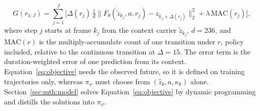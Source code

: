 \begin{equation}
G(r_{1:J})=\sum_{j=1}^{J}\Big[\Delta(r_j)\,\tfrac1d\big\lVert F_\theta(\tilde z_{k_j},a,r_j)-z_{k_j+\Delta(r_j)}\big\rVert_2^2+\lambda\,\mathrm{MAC}(r_j)\Big],
\label{eq:objective}
\end{equation}
where step $j$ starts at frame $k_j$ from the context carrier $\tilde z_{k_j}$, $d=236$, and $\mathrm{MAC}(r)$ is the multiply-accumulate count of one transition under $r$, policy included, relative to the continuous transition at $\Delta=15$. The error term is the duration-weighted error of one prediction from its context. Equation~\ref{eq:objective} needs the observed future, so it is defined on training trajectories only, whereas $\pi_\psi$ must choose from $(\hat z_k,a,\kappa_k)$ alone. Section~\ref{sec:mth:model} solves Equation~\ref{eq:objective} by dynamic programming and distills the solutions into $\pi_\psi$.

